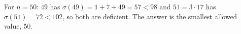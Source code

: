 For $n=50$: $49$ has $\sigma(49)=1+7+49=57<98$ and $51=3\cdot17$ has $\sigma(51)=72<102$, so both are deficient. The answer is the smallest allowed value, $\boxed{50}$.

